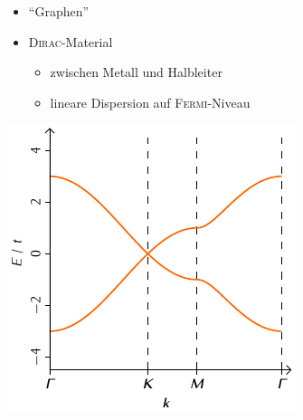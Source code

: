 \documentclass{beamer}
\begin{document}
\begin{frame}
\begin{minipage}[b][0.48\textwidth][c]{0.48\textwidth}
{				\begin{itemize}
					\item "`Graphen"'
					\item \textsc{Dirac}-Material
					\begin{itemize}
						\item zwischen Metall und Halbleiter
						\item lineare Dispersion auf \textsc{Fermi}-Niveau
					\end{itemize}
				\end{itemize}
				}
		\end{minipage}
		\begin{minipage}{0.48\textwidth}
			\includegraphics[width=\textwidth]{Abbildungen/Bandstrukturen/C2.pdf}
		\end{minipage}
		\hfill
		\begin{minipage}{0.48\textwidth}

\end{minipage}
\end{frame}
\end{document}

